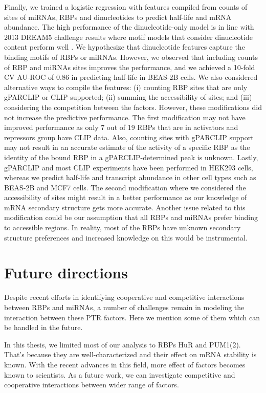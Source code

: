 Finally, we trained a logistic regression with features compiled from counts of sites of miRNAs, RBPs and dinucleotides to predict half-life and mRNA abundance. The high performance of the dinucleotide-only model is in line with 2013 DREAM5 challenge results where motif models that consider dinucleotide content perform well \cite{weirauch_13}. We hypothesize that dinucleotide features capture the binding motifs of RBPs or miRNAs. However, we observed that including counts of RBP and miRNAs sites improves the performance, and we achieved a 10-fold CV AU-ROC of 0.86 in predicting half-life in BEAS-2B cells. We also considered alternative ways to compile the features: (i) counting RBP sites that are only gPARCLIP or CLIP-supported; (ii) summing the accessibility of sites; and (iii) considering the competition between the factors. However, these modifications did not increase the predictive performance. The first modification may not have improved performance as only 7 out of 19 RBPs that are in activators and repressors group have CLIP data. Also, counting sites with gPARCLIP support may not result in an accurate estimate of the activity of a specific RBP as the identity of the bound RBP in a gPARCLIP-determined peak is unknown. Lastly, gPARCLIP and most CLIP experiments have been performed in HEK293 cells, whereas we predict half-life and transcript abundance in other cell types such as BEAS-2B and MCF7 cells. The second modification where we considered the accessibility of sites might result in a better performance as our knowledge of mRNA secondary structure gets more accurate. Another issue related to this modification could be our assumption that all RBPs and miRNAs prefer binding to accessible regions. In reality, most of the RBPs have unknown secondary structure preferences and increased knowledge on this would be instrumental.

\section{Future directions}

Despite recent efforts in identifying cooperative and competitive interactions between RBPs and miRNAs, a number of challenges remain in modeling the interaction between these PTR factors. Here we mention some of them which can be handled in the future.

In this thesis, we limited most of our analysis to RBPs HuR and PUM1(2). That’s because they are well-characterized and their effect on mRNA stability is known. With the recent advances in this field, more effect of factors becomes known to scientists. As a future work, we can investigate competitive and cooperative interactions between wider range of factors.

